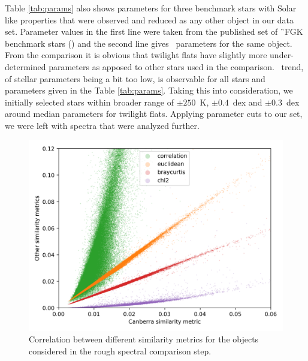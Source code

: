 Table \ref{tab:params} also shows parameters for three benchmark stars with Solar like properties that were observed and reduced as any other object in our data set. Parameter values in the first line were taken from the published set of \G\ FGK benchmark stars (\cite{2014A&A...564A.133J, 2015A&A...582A..49H}) and the second line gives \TC\ parameters for the same object. From the comparison it is obvious that twilight flats have slightly more under-determined parameters as apposed to other stars used in the comparison. \TC\ trend, of stellar parameters being a bit too low, is observable for all stars and parameters given in the Table \ref{tab:params}. Taking this into consideration, we initially selected stars within broader range of \Teff$ \pm 250 $~K, \Logg$ \pm 0.4 $~dex and \Feh$ \pm 0.3 $~dex around median parameters for twilight flats. Applying parameter cuts to our set, we were left with  spectra that were analyzed further.

\begin{figure}
	\centering
	\includegraphics[width=\columnwidth]{sim_combine_b2.png}
	\caption{Correlation between different similarity metrics for the objects considered in the rough spectral comparison step.}
	\label{fig:sim_combine}
\end{figure}

